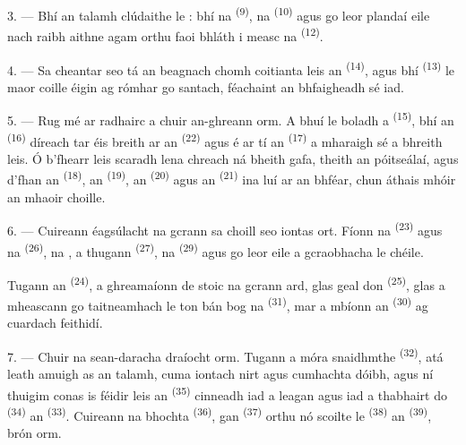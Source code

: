 3. --- Bhí an talamh clúdaithe le : bhí na
 \textsuperscript{(9)}, na 
\textsuperscript{(10)} agus go leor plandaí eile nach raibh aithne agam orthu faoi
bhláth i measc na  \textsuperscript{(12)}.

4. --- Sa cheantar seo tá an  beagnach chomh coitianta leis an
 \textsuperscript{(14)}, agus bhí 
\textsuperscript{(13)} le maor coille éigin ag rómhar go santach, féachaint an
bhfaigheadh sé iad.

\VUsaut{3.0mm}
\VUsaut{3.0mm}

5. --- Rug mé ar  radhairc a chuir an-ghreann orm. A bhuí le
boladh a  \textsuperscript{(15)}, bhí an 
\textsuperscript{(16)} díreach tar éis breith ar an 
\textsuperscript{(22)} agus é ar tí an 
\textsuperscript{(17)} a mharaigh sé a bhreith leis. Ó b'fhearr leis scaradh lena
chreach ná bheith gafa, theith an póitseálaí, agus d'fhan an 
\textsuperscript{(18)}, an  \textsuperscript{(19)}, an
 \textsuperscript{(20)} agus an 
\textsuperscript{(21)} ina luí ar an bhféar, chun áthais mhóir an mhaoir choille.

6. --- Cuireann éagsúlacht na gcrann sa choill seo iontas ort. Fíonn na
 \textsuperscript{(23)} agus na 
\textsuperscript{(26)}, na , a thugann 
\textsuperscript{(27)}, na  \textsuperscript{(29)} agus go leor
eile a gcraobhacha le chéile.

Tugann an  \textsuperscript{(24)}, a ghreamaíonn de stoic na
gcrann ard, glas geal don  \textsuperscript{(25)}, glas a
mheascann go taitneamhach le ton bán bog na 
\textsuperscript{(31)}, mar a mbíonn an 
\textsuperscript{(30)} ag cuardach feithidí.

\VUsaut{3.0mm}
\VUsaut{3.0mm}

7. --- Chuir na sean-daracha draíocht orm. Tugann a  móra
snaidhmthe \textsuperscript{(32)}, atá leath amuigh as an talamh, cuma iontach
nirt agus cumhachta dóibh, agus ní thuigim conas is féidir leis an
 \textsuperscript{(35)} cinneadh iad a leagan agus iad a thabhairt
do  \textsuperscript{(34)} an 
\textsuperscript{(33)}. Cuireann na  bhochta \textsuperscript{(36)},
gan  \textsuperscript{(37)} orthu nó scoilte le 
\textsuperscript{(38)} an  \textsuperscript{(39)}, brón orm.


